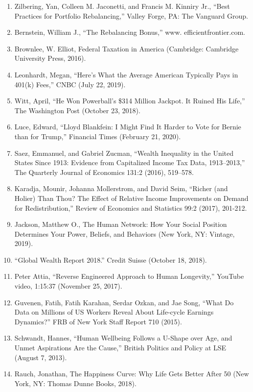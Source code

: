 \begin{enumerate}
\item\hypertarget{endnote:95}{} Zilbering, Yan, Colleen M. Jaconetti, and Francis M. Kinniry Jr., “Best Practices for Portfolio Rebalancing,” Valley Forge, PA: The Vanguard Group.
\item\hypertarget{endnote:96}{} Bernstein, William J., “The Rebalancing Bonus,” www. efficientfrontier.com.
\item\hypertarget{endnote:97}{} Brownlee, W. Elliot, Federal Taxation in America (Cambridge: Cambridge University Press, 2016).
\item\hypertarget{endnote:98}{} Leonhardt, Megan, “Here's What the Average American Typically Pays in 401(k) Fees,” CNBC (July 22, 2019).
\item\hypertarget{endnote:99}{} Witt, April, “He Won Powerball’s \$314 Million Jackpot. It Ruined His Life,” The Washington Post (October 23, 2018).
\item\hypertarget{endnote:100}{} Luce, Edward, “Lloyd Blankfein: I Might Find It Harder to Vote for Bernie than for Trump,” Financial Times (February 21, 2020).
\item\hypertarget{endnote:101}{} Saez, Emmanuel, and Gabriel Zucman, “Wealth Inequality in the United States Since 1913: Evidence from Capitalized Income Tax Data, 1913–2013,” The Quarterly Journal of Economics 131:2 (2016), 519–578.
\item\hypertarget{endnote:102}{} Karadja, Mounir, Johanna Mollerstrom, and David Seim, “Richer (and Holier) Than Thou? The Effect of Relative Income Improvements on Demand for Redistribution,” Review of Economics and Statistics 99:2 (2017), 201-212.
\item\hypertarget{endnote:103}{} Jackson, Matthew O., The Human Network: How Your Social Position Determines Your Power, Beliefs, and Behaviors (New York, NY: Vintage, 2019).
\item\hypertarget{endnote:104}{} “Global Wealth Report 2018.” Credit Suisse (October 18, 2018).
\item\hypertarget{endnote:105}{} Peter Attia, “Reverse Engineered Approach to Human Longevity,” YouTube video, 1:15:37 (November 25, 2017).
\item\hypertarget{endnote:106}{} Guvenen, Fatih, Fatih Karahan, Serdar Ozkan, and Jae Song, “What Do Data on Millions of US Workers Reveal About Life-cycle Earnings Dynamics?” FRB of New York Staff Report 710 (2015).
\item\hypertarget{endnote:107}{} Schwandt, Hannes, “Human Wellbeing Follows a U-Shape over Age, and Unmet Aspirations Are the Cause,” British Politics and Policy at LSE (August 7, 2013).
\item\hypertarget{endnote:108}{} Rauch, Jonathan, The Happiness Curve: Why Life Gets Better After 50 (New York, NY: Thomas Dunne Books, 2018).
\end{enumerate}
